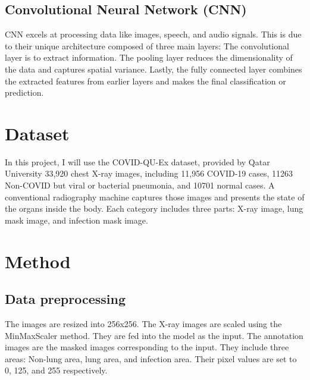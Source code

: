 \documentclass{article}
\begin{document}
\subsection{Convolutional Neural Network (CNN)} CNN excels at processing data like images, speech, and audio signals. This is due to their unique architecture composed of three main layers: The convolutional layer is to extract information. The pooling layer reduces the dimensionality of the data and captures spatial variance. Lastly, the fully connected layer combines the extracted features from earlier layers and makes the final classification or prediction.
\section{Dataset}
In this project, I will use the COVID-QU-Ex dataset, provided by Qatar University 33,920 chest X-ray images, including 11,956 COVID-19 cases, 11263 Non-COVID but viral or bacterial pneumonia, and 10701 normal cases. A conventional radiography machine captures those images and presents the state of the organs inside the body. Each category includes three parts: X-ray image, lung mask image, and infection mask image.\\

\section{Method}
\subsection{Data preprocessing} The images are resized into 256x256. The X-ray images are scaled using the MinMaxScaler method. They are fed into the model as the input. The annotation images are the masked images corresponding to the input. They include three areas: Non-lung area, lung area, and infection area. Their pixel values are set to 0, 125, and 255 respectively.
\end{document}

